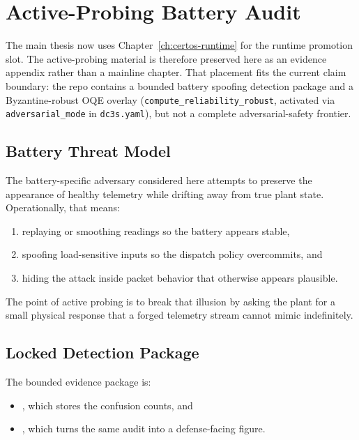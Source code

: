 \chapter{Active-Probing Battery Audit}
\label{app:active-probing-audit}

The main thesis now uses Chapter~\ref{ch:certos-runtime} for the runtime
promotion slot.  The active-probing material is therefore preserved here as
an evidence appendix rather than a mainline chapter.  That placement fits
the current claim boundary: the repo contains a bounded battery spoofing
detection package and a Byzantine-robust OQE overlay
(\texttt{compute\_reliability\_robust}, activated via
\texttt{adversarial\_mode} in \texttt{dc3s.yaml}), but not a complete
adversarial-safety frontier.

\section{Battery Threat Model}

The battery-specific adversary considered here attempts to preserve the
appearance of healthy telemetry while drifting away from true plant state.
Operationally, that means:

\begin{enumerate}
  \item replaying or smoothing readings so the battery appears stable,
  \item spoofing load-sensitive inputs so the dispatch policy overcommits,
    and
  \item hiding the attack inside packet behavior that otherwise appears
    plausible.
\end{enumerate}

The point of active probing is to break that illusion by asking the plant
for a small physical response that a forged telemetry stream cannot mimic
indefinitely.

\section{Locked Detection Package}

The bounded evidence package is:

\begin{itemize}
  \item {}, which stores the
    confusion counts, and
  \item {}, which turns the
    same audit into a defense-facing figure.
\end{itemize}

